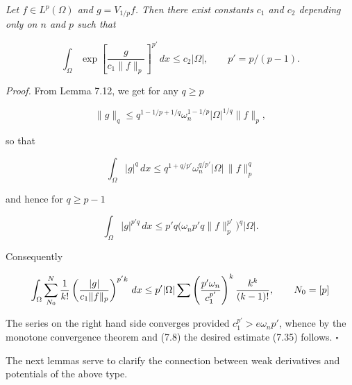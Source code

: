 \begin{lemma}\label{gt:lem-sobolev-riemann-potential-exponential}
\textit{Let $f\in L^p(\Omega)$ and $g=V_{1/p}f$.
Then there exist constants $c_1$ and $c_2$ depending only on $n$ and $p$ such
that}

\[
\tag{7.35}
\int_\Omega \exp\!\left[\frac{g}{c_1\|f\|_p}\right]^{p'}\,dx \le c_2|\Omega|,
\qquad p' = p/(p-1).
\]

\noindent\textit{Proof.} From Lemma 7.12, we get for any $q\ge p$

\[
\|g\|_q \le q^{1-1/p+1/q}\omega_n^{1-1/p}|\Omega|^{1/q}\|f\|_p,
\]

\noindent so that

\[
\int_\Omega |g|^q\,dx \le q^{1+q/p'}\omega_n^{q/p'}|\Omega|\,\|f\|_p^q
\]

\noindent and hence for $q\ge p-1$

\[
\int_\Omega |g|^{p'q}\,dx \le p'q\bigl(\omega_n p'q\|f\|_p^{p'}\bigr)^q|\Omega|.
\]


Consequently

\[
\int_{\Omega}\sum_{N_0}^{N}\frac{1}{k!}\left(\frac{\left|g\right|}{c_1\lVert f\rVert_p}\right)^{p'k}\,dx
\le p'|\Omega|\sum\left(\frac{p'\omega_n}{c_1^{p'}}\right)^k\frac{k^k}{(k-1)!},
\qquad N_0=[p]
\]

The series on the right hand side converges provided $c_1^{p'}>e\omega_n p'$, whence by the
monotone convergence theorem and (7.8) the desired estimate (7.35) follows. $\square$

The next lemmas serve to clarify the connection between weak derivatives and
potentials of the above type.

\end{lemma}

